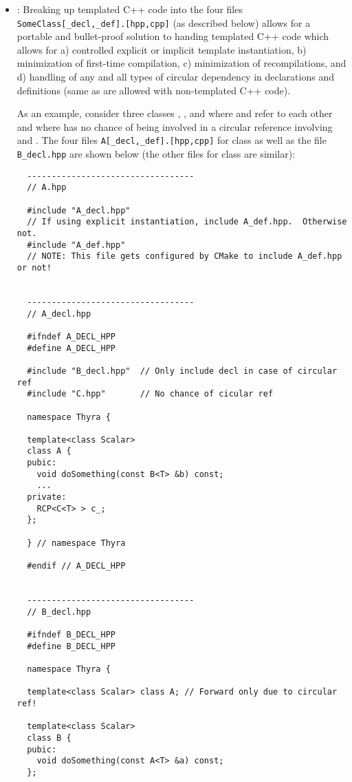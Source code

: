 \begin{itemize}
\item\GCGTemplateHeaders\label{gcg:template-instantation-files}:
Breaking up templated C++ code into the four files
\texttt{SomeClass[\_decl,\_def].[hpp,cpp]} (as described below)
allows for a portable and bullet-proof solution to handing templated
C++ code which allows for a) controlled explicit or implicit template
instantiation, b) minimization of first-time compilation, c)
minimization of recompilations, and d) handling of any and all types
of circular dependency in declarations and definitions (same as are
allowed with non-templated C++ code).

As an example, consider three classes , , and 
where  and  refer to each other and where  has no
chance of being involved in a circular reference involving  and
.  The four files \texttt{A[\_decl,\_def].[hpp,cpp]} for class
 as well as the file \texttt{B\_decl.hpp} are shown below (the
other files for class  are similar):


{\small\begin{verbatim}
  ----------------------------------
  // A.hpp

  #include "A_decl.hpp"
  // If using explicit instantiation, include A_def.hpp.  Otherwise not.
  #include "A_def.hpp"
  // NOTE: This file gets configured by CMake to include A_def.hpp or not!


  ----------------------------------
  // A_decl.hpp

  #ifndef A_DECL_HPP
  #define A_DECL_HPP

  #include "B_decl.hpp"  // Only include decl in case of circular ref
  #include "C.hpp"       // No chance of cicular ref

  namespace Thyra {

  template<class Scalar>
  class A {
  pubic:
    void doSomething(const B<T> &b) const;
    ...
  private:
    RCP<C<T> > c_;
  };

  } // namespace Thyra

  #endif // A_DECL_HPP


  ----------------------------------
  // B_decl.hpp

  #ifndef B_DECL_HPP
  #define B_DECL_HPP

  namespace Thyra {

  template<class Scalar> class A; // Forward only due to circular ref!

  template<class Scalar>
  class B {
  pubic:
    void doSomething(const A<T> &a) const;
  };


\end{verbatim}}
\end{itemize}
